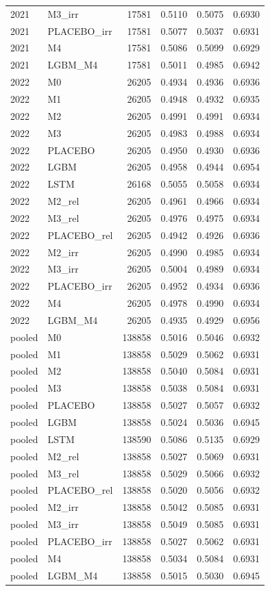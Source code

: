 \begin{tabular}{llrrrr}
2021 & M3\_irr & 17581 & 0.5110 & 0.5075 & 0.6930 \\
2021 & PLACEBO\_irr & 17581 & 0.5077 & 0.5037 & 0.6931 \\
2021 & M4 & 17581 & 0.5086 & 0.5099 & 0.6929 \\
2021 & LGBM\_M4 & 17581 & 0.5011 & 0.4985 & 0.6942 \\
2022 & M0 & 26205 & 0.4934 & 0.4936 & 0.6936 \\
2022 & M1 & 26205 & 0.4948 & 0.4932 & 0.6935 \\
2022 & M2 & 26205 & 0.4991 & 0.4991 & 0.6934 \\
2022 & M3 & 26205 & 0.4983 & 0.4988 & 0.6934 \\
2022 & PLACEBO & 26205 & 0.4950 & 0.4930 & 0.6936 \\
2022 & LGBM & 26205 & 0.4958 & 0.4944 & 0.6954 \\
2022 & LSTM & 26168 & 0.5055 & 0.5058 & 0.6934 \\
2022 & M2\_rel & 26205 & 0.4961 & 0.4966 & 0.6934 \\
2022 & M3\_rel & 26205 & 0.4976 & 0.4975 & 0.6934 \\
2022 & PLACEBO\_rel & 26205 & 0.4942 & 0.4926 & 0.6936 \\
2022 & M2\_irr & 26205 & 0.4990 & 0.4985 & 0.6934 \\
2022 & M3\_irr & 26205 & 0.5004 & 0.4989 & 0.6934 \\
2022 & PLACEBO\_irr & 26205 & 0.4952 & 0.4934 & 0.6936 \\
2022 & M4 & 26205 & 0.4978 & 0.4990 & 0.6934 \\
2022 & LGBM\_M4 & 26205 & 0.4935 & 0.4929 & 0.6956 \\
pooled & M0 & 138858 & 0.5016 & 0.5046 & 0.6932 \\
pooled & M1 & 138858 & 0.5029 & 0.5062 & 0.6931 \\
pooled & M2 & 138858 & 0.5040 & 0.5084 & 0.6931 \\
pooled & M3 & 138858 & 0.5038 & 0.5084 & 0.6931 \\
pooled & PLACEBO & 138858 & 0.5027 & 0.5057 & 0.6932 \\
pooled & LGBM & 138858 & 0.5024 & 0.5036 & 0.6945 \\
pooled & LSTM & 138590 & 0.5086 & 0.5135 & 0.6929 \\
pooled & M2\_rel & 138858 & 0.5027 & 0.5069 & 0.6931 \\
pooled & M3\_rel & 138858 & 0.5029 & 0.5066 & 0.6932 \\
pooled & PLACEBO\_rel & 138858 & 0.5020 & 0.5056 & 0.6932 \\
pooled & M2\_irr & 138858 & 0.5042 & 0.5085 & 0.6931 \\
pooled & M3\_irr & 138858 & 0.5049 & 0.5085 & 0.6931 \\
pooled & PLACEBO\_irr & 138858 & 0.5027 & 0.5062 & 0.6931 \\
pooled & M4 & 138858 & 0.5034 & 0.5084 & 0.6931 \\
pooled & LGBM\_M4 & 138858 & 0.5015 & 0.5030 & 0.6945 \\
\bottomrule
\end{tabular}
